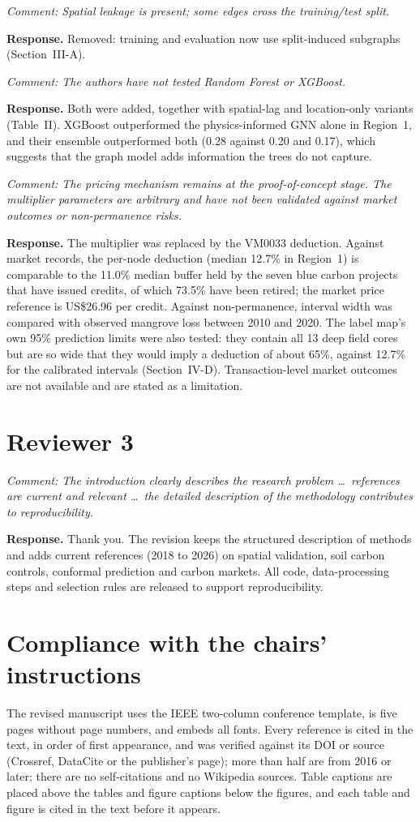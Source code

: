 \documentclass[10pt]{article}
\newcommand{\rc}[1]{\par\textit{Comment: #1}\par}
\newcommand{\resp}{\textbf{Response.} }
\begin{document}
\rc{Spatial leakage is present; some edges cross the training/test split.}
\resp Removed: training and evaluation now use split-induced subgraphs (Section~III-A).

\rc{The authors have not tested Random Forest or XGBoost.}
\resp Both were added, together with spatial-lag and location-only variants (Table~II). XGBoost outperformed the physics-informed GNN alone in Region~1, and their ensemble outperformed both (0.28 against 0.20 and 0.17), which suggests that the graph model adds information the trees do not capture.

\rc{The pricing mechanism remains at the proof-of-concept stage. The multiplier parameters are arbitrary and have not been validated against market outcomes or non-permanence risks.}
\resp The multiplier was replaced by the VM0033 deduction. Against market records, the per-node deduction (median 12.7\% in Region~1) is comparable to the 11.0\% median buffer held by the seven blue carbon projects that have issued credits, of which 73.5\% have been retired; the market price reference is US\$26.96 per credit. Against non-permanence, interval width was compared with observed mangrove loss between 2010 and 2020. The label map's own 95\% prediction limits were also tested: they contain all 13 deep field cores but are so wide that they would imply a deduction of about 65\%, against 12.7\% for the calibrated intervals (Section~IV-D). Transaction-level market outcomes are not available and are stated as a limitation.

\section*{Reviewer 3}

\rc{The introduction clearly describes the research problem \dots\ references are current and relevant \dots\ the detailed description of the methodology contributes to reproducibility.}
\resp Thank you. The revision keeps the structured description of methods and adds current references (2018 to 2026) on spatial validation, soil carbon controls, conformal prediction and carbon markets. All code, data-processing steps and selection rules are released to support reproducibility.

\section*{Compliance with the chairs' instructions}
The revised manuscript uses the IEEE two-column conference template, is five pages without page numbers, and embeds all fonts. Every reference is cited in the text, in order of first appearance, and was verified against its DOI or source (Crossref, DataCite or the publisher's page); more than half are from 2016 or later; there are no self-citations and no Wikipedia sources. Table captions are placed above the tables and figure captions below the figures, and each table and figure is cited in the text before it appears.
\end{document}
